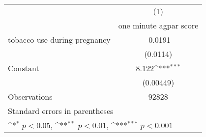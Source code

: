 {
\def\sym#1{\ifmmode^{#1}\else\(^{#1}\)\fi}
\begin{tabular}{l*{1}{c}}
\hline\hline
                    &\multicolumn{1}{c}{(1)}\\
                    &\multicolumn{1}{c}{one minute agpar score}\\
\hline
tobacco use during pregnancy&     -0.0191         \\
                    &    (0.0114)         \\
[1em]
Constant            &       8.122\sym{***}\\
                    &   (0.00449)         \\
\hline
Observations        &       92828         \\
\hline\hline
\multicolumn{2}{l}{\footnotesize Standard errors in parentheses}\\
\multicolumn{2}{l}{\footnotesize \sym{*} \(p<0.05\), \sym{**} \(p<0.01\), \sym{***} \(p<0.001\)}\\
\end{tabular}
}

